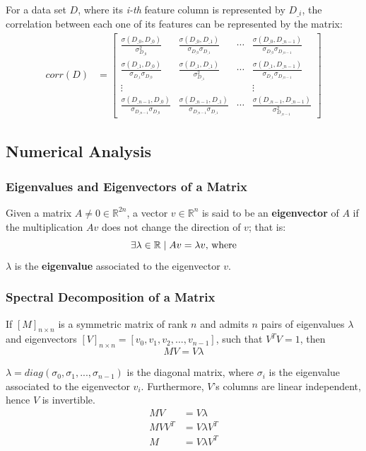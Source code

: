 \documentclass[12pt]{article}
\begin{document}
For a data set $D$, where its {\em i-th} feature column is represented by $D_{\_i}$, the correlation between each one of its features can be represented by the matrix:
\begin{align*}
	corr(D) &= \begin{bmatrix}
		\frac{\sigma(D_{\_0}, D_{\_0})}{\sigma_{D_{\_0}}^2} & \frac{\sigma(D_{\_0}, D_{\_1})}{\sigma_{D_{\_0}} \sigma_{D_{\_1}}} & \cdots & \frac{\sigma(D_{\_0}, D_{\_n-1})}{\sigma_{D_{\_0}} \sigma_{D_{\_n-1}}} \\
		\frac{\sigma(D_{\_1}, D_{\_0})}{\sigma_{D_{\_1}} \sigma_{D_{\_0}}} & \frac{\sigma(D_{\_1}, D_{\_1})}{\sigma_{D_{\_1}}^2} & \cdots & \frac{\sigma(D_{\_1}, D_{\_n-1})}{\sigma_{D_{\_1}} \sigma_{D_{\_n-1}}} \\
		\vdots &&& \vdots \\
		\frac{\sigma(D_{\_n-1}, D_{\_0})}{\sigma_{D_{\_n-1}} \sigma_{D_{\_0}}} & \frac{\sigma(D_{\_n-1}, D_{\_1})}{\sigma_{D_{\_n-1}} \sigma_{D_{\_1}}} & \cdots & \frac{\sigma(D_{\_n-1}, D_{\_n-1})}{\sigma_{D_{\_n-1}}^2}
	\end{bmatrix}
\end{align*}

\subsection{Numerical Analysis}
\subsubsection{Eigenvalues and Eigenvectors of a Matrix}

Given a matrix $A \ne 0 \in \mathbb{R}^{2n}$, a vector $v \in \mathbb{R}^n$ is said to be an \textbf{eigenvector} of $A$ if the multiplication $Av$ does not change the direction of $v$; that is:
$$\exists \lambda \in \mathbb{R} \mid Av = \lambda v \textnormal{, where}$$
$\lambda$ is the \textbf{eigenvalue} associated to the eigenvector $v$.

\subsubsection{Spectral Decomposition of a Matrix}

If $[M]_{n\times n}$ is a symmetric matrix of rank $n$ and admits $n$ pairs of eigenvalues $\lambda$ and eigenvectors $[V]_{n\times n} = [v_0, v_1, v_2, ..., v_{n-1}]$, such that $V^TV = 1$, then
$$MV = V \lambda$$

$\lambda = diag(\sigma_0, \sigma_1, ..., \sigma_{n-1})$ is the diagonal matrix, where $\sigma_i$ is the eigenvalue associated to the eigenvector $v_i$. \cite{cox2001} Furthermore, $V$'s columns are linear independent, hence $V$ is invertible.
\begin{align*}
	MV &= V \lambda \\
	MVV^T &= V \lambda V^T \\
	M &= V \lambda V^T
\end{align*}
\end{document}
